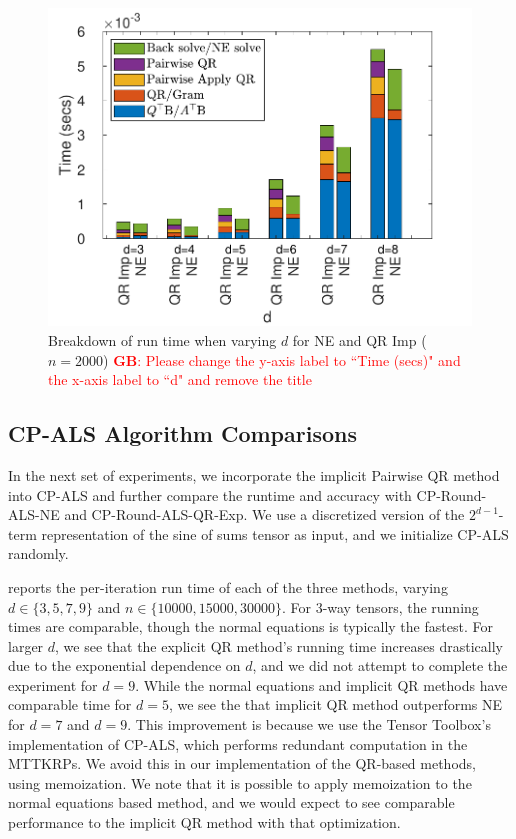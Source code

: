 \documentclass{article}
\newcommand{\GB}[1]{\textcolor{red}{\textbf{GB}: #1}}
\begin{document}
\begin{figure}[ht!]
  \begin{center}
    \includegraphics[scale = 0.8]{breakdown_p.pdf}
    \caption[Figure]{Breakdown of run time when varying $d$ for NE and QR Imp ($n=2000$) \GB{Please change the y-axis label to ``Time (secs)" and the x-axis label to ``d" and remove the title}\label{fig:LS_problem_breakdown}}
  \end{center}
\end{figure}

\subsection{CP-ALS Algorithm Comparisons}

In the next set of experiments, we incorporate the implicit Pairwise QR method into CP-ALS and further compare the runtime and accuracy with CP-Round-ALS-NE and CP-Round-ALS-QR-Exp. 
We use a discretized version of the $2^{d-1}$-term representation of the sine of sums tensor as input, and we initialize CP-ALS randomly.

 reports the per-iteration run time of each of the three methods, varying $d\in\{3,5,7,9\}$ and $n \in \{10000,15000,30000\}$.
For 3-way tensors, the running times are comparable, though the normal equations is typically the fastest.
For larger $d$, we see that the explicit QR method's running time increases drastically due to the exponential dependence on $d$, and we did not attempt to complete the experiment for $d=9$.
While the normal equations and implicit QR methods have comparable time for $d=5$, we see the that implicit QR method outperforms NE for $d=7$ and $d=9$.
This improvement is because we use the Tensor Toolbox's implementation of CP-ALS, which performs redundant computation in the MTTKRPs.
We avoid this in our implementation of the QR-based methods, using memoization.
We note that it is possible to apply memoization to the normal equations based method, and we would expect to see comparable performance to the implicit QR method with that optimization.
\end{document}
